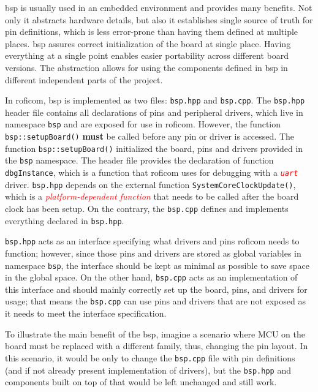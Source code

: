 \documentclass[
  digital,     %
  oneside,     %
  nosansbold,  %
  nocolorbold, %
  nolof,         %
  nolot,         %
]{fithesis4}
\newcommand{\TODO}[1]{\textcolor{red}{\textit{#1}}}
\begin{document}
{{{\acrshort{bsp} is usually used in an embedded environment and provides many benefits. Not only it abstracts hardware details, but also it establishes single source of truth for pin definitions, which is less error-prone than having them defined at multiple places. \acrshort{bsp} assures correct initialization of the board at single place. Having everything at a single point enables easier portability across different board versions. The abstraction allows for using the components defined in \acrshort{bsp} in different independent parts of the project. 

In \acrshort{roficom}, \acrshort{bsp} is implemented as two files: \verb|bsp.hpp| and \verb|bsp.cpp|. The \verb|bsp.hpp| header file contains all declarations of pins and peripheral drivers, which live in namespace \lstinline{bsp} and are exposed for use in \acrshort{roficom}. However, the function \lstinline{bsp::setupBoard()} \textbf{must} be called before any pin or driver is accessed. The function \lstinline{bsp::setupBoard()} initialized the board, pins and drivers provided in the \lstinline{bsp} namespace. The header file provides the declaration of function \lstinline{dbgInstance}, which is a function that \acrshort{roficom} uses for debugging with a \TODO{ \texttt{uart} } driver. \verb|bsp.hpp| depends on the external function \lstinline|SystemCoreClockUpdate()|, which is a \TODO{platform-dependent function} that needs to be called after the board clock has been setup. On the contrary, the \verb|bsp.cpp| defines and implements everything declared in \verb|bsp.hpp|. 

\verb|bsp.hpp| acts as an interface specifying what drivers and pins \acrshort{roficom} needs to function; however, since those pins and drivers are stored as global variables in namespace \lstinline{bsp}, the interface should be kept as minimal as possible to save space in the global space. On the other hand, \verb|bsp.cpp| acts as an implementation of this interface and should mainly correctly set up the board, pins, and drivers for usage; that means the \verb|bsp.cpp| can use pins and drivers that are not exposed as it needs to meet the interface specification.

To illustrate the main benefit of the \acrshort{bsp}, imagine a scenario where MCU on the board must be replaced with a different family, thus, changing the pin layout. In this scenario, it would be only to change the \verb|bsp.cpp| file with pin definitions (and if not already present implementation of drivers), but the \verb|bsp.hpp| and components built on top of that would be left unchanged and still work.

}}}
\end{document}
